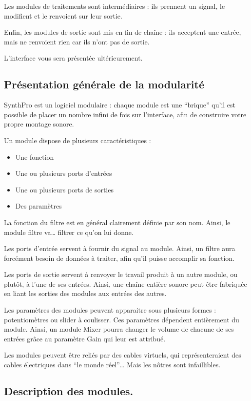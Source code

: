 \documentclass[a4paper,oneside,frenchb,12pt]{article}
\begin{document}
Les modules de traitements sont intermédiaires : ils prennent un
signal, le modifient et le renvoient sur leur sortie.

Enfin, les modules de sortie sont mis en fin de chaîne : ils
acceptent une entrée, mais ne renvoient rien car ils n'ont pas de
sortie.

L'interface vous sera présentée ultérieurement.

\subsection{Présentation générale de la modularité}

SynthPro est un logiciel modulaire : chaque module est une
``brique'' qu'il est possible de placer un nombre infini de fois
sur l'interface, afin de construire votre propre montage sonore.

Un module dispose de plusieurs caractéristiques :

\begin{itemize}
\item
  Une fonction
\item
  Une ou plusieurs ports d'entrées
\item
  Une ou plusieurs ports de sorties
\item
  Des paramètres
\end{itemize}
La fonction du filtre est en général clairement définie par son
nom. Ainsi, le module filtre va\ldots{} filtrer ce qu'on lui
donne.

Les ports d'entrée servent à fournir du signal au module. Ainsi, un
filtre aura forcément besoin de données à traiter, afin qu'il
puisse accomplir sa fonction.

Les ports de sortie servent à renvoyer le travail produit à un
autre module, ou plutôt, à l'une de ses entrées. Ainsi, une chaîne
entière sonore peut être fabriquée en liant les sorties des modules
aux entrées des autres.

Les paramètres des modules peuvent apparaitre sous plusieurs formes
: potentiomètres ou slider à coulisser. Ces paramètres dépendent
entièrement du module. Ainsi, un module Mixer pourra changer le
volume de chacune de ses entrées grâce au paramètre Gain qui leur
est attribué.

Les modules peuvent être reliés par des cables virtuels, qui
représenteraient des cables électriques dans
``le monde réel''\ldots{} Mais les nôtres sont infaillibles.

\subsection{Description des modules.}
\end{document}
